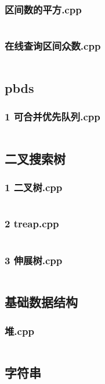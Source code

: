 \documentclass[a4paper,11pt]{article}
\begin{document}
\subsubsection{区间数的平方.cpp}
\inputminted[breaklines]{c++}{"D:/tmplz/templates/数据结构/fenkuai/区间数的平方.cpp"}
\subsubsection{在线查询区间众数.cpp}
\inputminted[breaklines]{c++}{"D:/tmplz/templates/数据结构/fenkuai/在线查询区间众数.cpp"}
\subsection{pbds}
\subsubsection{1 可合并优先队列.cpp}
\inputminted[breaklines]{c++}{"D:/tmplz/templates/数据结构/pbds/1 可合并优先队列.cpp"}
\subsection{二叉搜索树}
\subsubsection{1 二叉树.cpp}
\inputminted[breaklines]{c++}{"D:/tmplz/templates/数据结构/二叉搜索树/1 二叉树.cpp"}
\subsubsection{2 treap.cpp}
\inputminted[breaklines]{c++}{"D:/tmplz/templates/数据结构/二叉搜索树/2 treap.cpp"}
\subsubsection{3 伸展树.cpp}
\inputminted[breaklines]{c++}{"D:/tmplz/templates/数据结构/二叉搜索树/3 伸展树.cpp"}
\subsection{基础数据结构}
\subsubsection{堆.cpp}
\inputminted[breaklines]{c++}{"D:/tmplz/templates/数据结构/基础数据结构/堆.cpp"}
\subsection{字符串}
\end{document}
